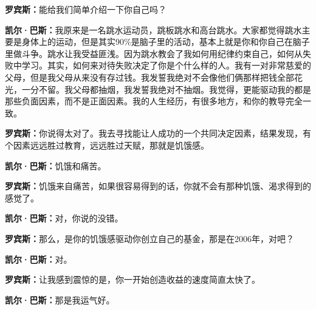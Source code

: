 \begin{BookQuote}
\textbf{罗宾斯：}能给我们简单介绍一下你自己吗？
\end{BookQuote}

\begin{BookQuote}
\textbf{凯尔·巴斯：}我原来是一名跳水运动员，跳板跳水和高台跳水。大家都觉得跳水主要是身体上的运动，但是其实90\%是脑子里的活动，基本上就是你和你自己在脑子里做斗争。跳水让我受益匪浅。因为跳水教会了我如何用纪律约束自己，如何从失败中学习。其实，如何来对待失败决定了你是个什么样的人。我有一对非常慈爱的父母，但是我父母从来没有存过钱。我发誓我绝对不会像他们俩那样把钱全部花光，一分不留。我父母都抽烟，我发誓我绝对不抽烟。我觉得，更能驱动我的都是那些负面因素，而不是正面因素。我的人生经历，有很多地方，和你的教导完全一致。
\end{BookQuote}

\begin{BookQuote}
\textbf{罗宾斯：}你说得太对了。我去寻找能让人成功的一个共同决定因素，结果发现，有个因素远远胜过教育，远远胜过天赋，那就是饥饿感。
\end{BookQuote}

\begin{BookQuote}
\textbf{凯尔·巴斯：}饥饿和痛苦。
\end{BookQuote}

\begin{BookQuote}
\textbf{罗宾斯：}饥饿来自痛苦，如果很容易得到的话，你就不会有那种饥饿、渴求得到的感觉了。
\end{BookQuote}

\begin{BookQuote}
\textbf{凯尔·巴斯：}对，你说的没错。
\end{BookQuote}

\begin{BookQuote}
\textbf{罗宾斯：}那么，是你的饥饿感驱动你创立自己的基金，那是在2006年，对吧？
\end{BookQuote}

\begin{BookQuote}
\textbf{凯尔·巴斯：}对。
\end{BookQuote}

\begin{BookQuote}
\textbf{罗宾斯：}让我感到震惊的是，你一开始创造收益的速度简直太快了。
\end{BookQuote}

\begin{BookQuote}
\textbf{凯尔·巴斯：}那是我运气好。
\end{BookQuote}

